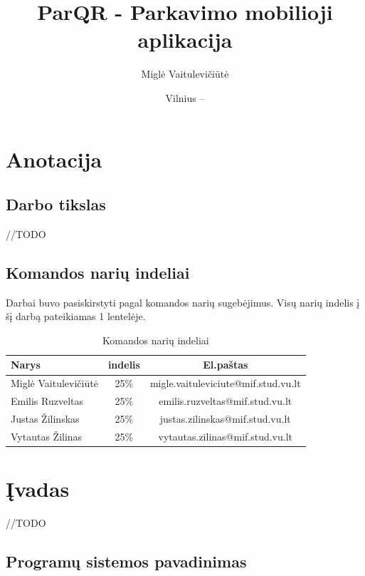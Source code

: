 \documentclass{VUMIFPSkursinis}
\title{ParQR - Parkavimo mobilioji aplikacija}
\author{Miglė Vaitulevičiūtė}
\date{Vilnius – \the\year}
\begin{document}
\maketitle

\tableofcontents

\section*{Anotacija}

\subsection*{Darbo tikslas}

//TODO

\subsection*{Komandos narių indeliai}

Darbai buvo pasiskirstyti pagal komandos narių sugebėjimus. Visų narių indelis į šį darbą pateikiamas 1 lentelėje.

\begin{table}[H]\footnotesize
  \centering
  \caption{Komandos narių indeliai}
  {\begin{tabular}{|l|c|c|} \hline
    Narys & indelis & El.paštas \\
    \hline
    Miglė Vaitulevičiūtė& 25\% & migle.vaituleviciute@mif.stud.vu.lt       		\\
    Emilis Ruzveltas 	& 25\% & emilis.ruzveltas@mif.stud.vu.lt       			\\
    Justas Žilinskas 	& 25\% & justas.zilinskas@mif.stud.vu.lt       			\\
    Vytautas Žilinas 	& 25\% & vytautas.zilinas@mif.stud.vu.lt       			\\
    \hline
  \end{tabular}}
  \label{tab:komanda}
\end{table}

\section*{Įvadas}

//TODO


\subsection*{Programų sistemos pavadinimas}
\end{document}
